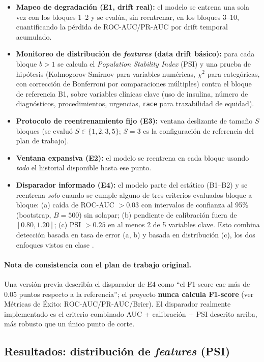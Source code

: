 \documentclass[11pt,a4paper]{article}
\begin{document}
\begin{itemize}[leftmargin=*]
    \item \textbf{Mapeo de degradación (E1, drift real):} el modelo se entrena una sola vez con los bloques 1--2 y se evalúa, sin reentrenar, en los bloques 3--10, cuantificando la pérdida de ROC-AUC/PR-AUC por drift temporal acumulado.
    \item \textbf{Monitoreo de distribución de \emph{features} (data drift básico):} para cada bloque $b>1$ se calcula el \emph{Population Stability Index} (PSI) \cite{siddiqi2006} y una prueba de hipótesis (Kolmogorov-Smirnov para variables numéricas, $\chi^2$ para categóricas, con corrección de Bonferroni por comparaciones múltiples) contra el bloque de referencia B1, sobre variables clínicas clave (uso de insulina, número de diagnósticos, procedimientos, urgencias, \texttt{race} para trazabilidad de equidad).
    \item \textbf{Protocolo de reentrenamiento fijo (E3):} ventana deslizante de tamaño $S$ bloques (se evaluó $S\in\{1,2,3,5\}$; $S=3$ es la configuración de referencia del plan de trabajo).
    \item \textbf{Ventana expansiva (E2):} el modelo se reentrena en cada bloque usando \emph{todo} el historial disponible hasta ese punto.
    \item \textbf{Disparador informado (E4):} el modelo parte del estático (B1--B2) y se reentrena \emph{solo} cuando se cumple alguno de tres criterios evaluados bloque a bloque: (a) caída de ROC-AUC $>0.03$ con intervalos de confianza al 95\% (bootstrap, $B=500$) sin solapar; (b) pendiente de calibración fuera de $[0.80,1.20]$; (c) PSI $>0.25$ en al menos 2 de 5 variables clave. Esto combina detección basada en tasa de error (a, b) y basada en distribución (c), los dos enfoques vistos en clase \cite{soriano2026}.
\end{itemize}

\paragraph{Nota de consistencia con el plan de trabajo original.} Una versión previa describía el disparador de E4 como ``el F1-score cae más de 0.05 puntos respecto a la referencia''; el proyecto \textbf{nunca calcula F1-score} (ver Métricas de Éxito: ROC-AUC/PR-AUC/Brier). El disparador realmente implementado es el criterio combinado AUC + calibración + PSI descrito arriba, más robusto que un único punto de corte.

\subsection{Resultados: distribución de \emph{features} (PSI)}
\end{document}
